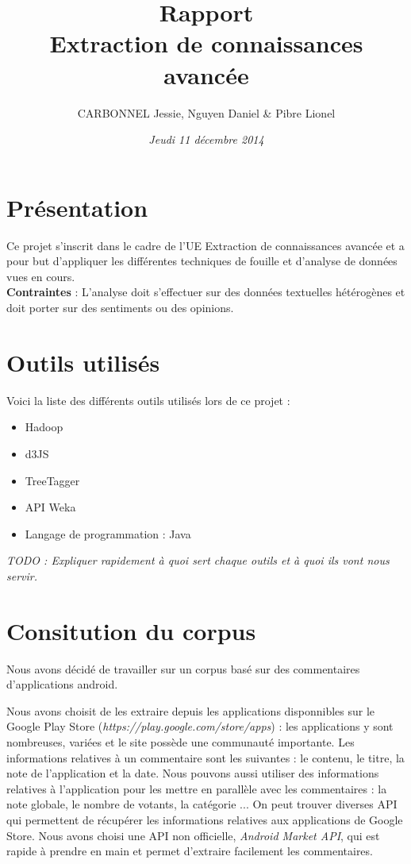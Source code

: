 \documentclass[a4paper, 11pt]{article}
\title{\textbf{Rapport}\\\Large{Extraction de connaissances avancée}}
\author{CARBONNEL Jessie, Nguyen Daniel \& Pibre Lionel}
\date{\textit{Jeudi 11 décembre 2014}}
\begin{document}
\maketitle

\section{Présentation}
Ce projet s'inscrit dans le cadre de l'UE Extraction de connaissances avancée et a pour but d'appliquer les différentes techniques de fouille et d'analyse de données vues en cours.\\

\textbf{Contraintes} : L'analyse doit s'effectuer sur des données textuelles hétérogènes et doit porter sur des sentiments ou des opinions.

\section{Outils utilisés}
Voici la liste des différents outils utilisés lors de ce projet : 
\begin{itemize}
\item Hadoop
\item d3JS
\item TreeTagger
\item API Weka
\item Langage de programmation : Java
\end{itemize}

\textit{TODO : Expliquer rapidement à quoi sert chaque outils et à quoi ils vont nous servir.}

\section{Consitution du corpus}

Nous avons décidé de travailler sur un corpus basé sur des commentaires d'applications android.

Nous avons choisit de les extraire depuis les applications disponnibles sur le Google Play Store (\textit{https://play.google.com/store/apps}) : les applications y sont nombreuses, variées et le site possède une communauté importante.
Les informations relatives à un commentaire sont les suivantes : le contenu, le titre, la note de l'application et la date. Nous pouvons aussi utiliser des informations relatives à l'application pour les mettre en parallèle avec les commentaires : la note globale, le nombre de votants, la catégorie ...
On peut trouver diverses API qui permettent de récupérer les informations relatives aux applications de Google Store. Nous avons choisi une API non officielle, \textit{Android Market API}, qui est rapide à prendre en main et permet d'extraire facilement les commentaires.
\end{document}
